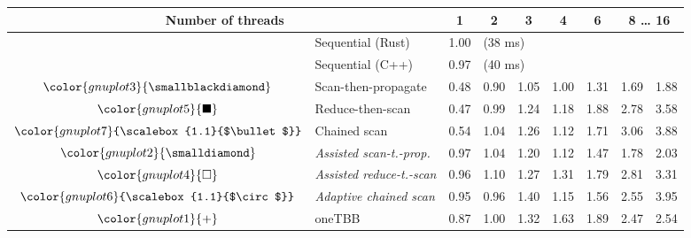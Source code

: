 \begin{tabular}{clrrrrrrr}
\toprule
\multicolumn{2}{c}{\textbf{Number of threads}} & \multicolumn{1}{c}{\textbf{ 1 }} & \multicolumn{1}{c}{\textbf{ 2 }} & \multicolumn{1}{c}{\textbf{ 3 }} & \multicolumn{1}{c}{\textbf{ 4 }} & \multicolumn{1}{c}{\textbf{ 6 }} & \multicolumn{2}{c}{\textbf{ 8 } \dots \textbf{ 16 }} \\
\midrule
& Sequential (Rust) & \multicolumn{1}{r}{ 1.00 } & \multicolumn{ 6 }{l}{(38 ms)} \\
& Sequential (C++) & \multicolumn{1}{r}{ 0.97 } & \multicolumn{ 6 }{l}{(40 ms)} \\
\rowcolor{gnuplot3!10}$\color{gnuplot3}{\smallblackdiamond}$ & Scan-then-propagate & \cellcolor{gnuplot3!10} 0.48 & \cellcolor{gnuplot3!10} 0.90 & \cellcolor{gnuplot3!10} 1.05 & \cellcolor{gnuplot3!10} 1.00 & \cellcolor{gnuplot3!10} 1.31 & \cellcolor{gnuplot3!10} 1.69 & \cellcolor{gnuplot3!10} 1.88 \\
\rowcolor{gnuplot5!10}$\color{gnuplot5}{\blacksquare}$ & Reduce-then-scan & \cellcolor{gnuplot5!10} 0.47 & \cellcolor{gnuplot5!10} 0.99 & \cellcolor{gnuplot5!10} 1.24 & \cellcolor{gnuplot5!10} 1.18 & \cellcolor{gnuplot5!10} 1.88 & \cellcolor{gnuplot5!10} 2.78 & \cellcolor{gnuplot5!10} 3.58 \\
\rowcolor{gnuplot7!10}$\color{gnuplot7}{\scalebox{1.1}{$\bullet$}}$ & Chained scan & \cellcolor{gnuplot7!10} 0.54 & \cellcolor{gnuplot7!10} 1.04 & \cellcolor{gnuplot7!10} 1.26 & \cellcolor{gnuplot7!10} 1.12 & \cellcolor{gnuplot7!10} 1.71 & \cellcolor{gnuplot7!10} 3.06 & \cellcolor{gnuplot7!10} 3.88 \\
\rowcolor{gnuplot2!30}$\color{gnuplot2}{\smalldiamond}$ & \textit{Assisted scan-t.-prop.} & \cellcolor{gnuplot2!30} 0.97 & \cellcolor{gnuplot2!30} 1.04 & \cellcolor{gnuplot2!30} 1.20 & \cellcolor{gnuplot2!30} 1.12 & \cellcolor{gnuplot2!30} 1.47 & \cellcolor{gnuplot2!30} 1.78 & \cellcolor{gnuplot2!30} 2.03 \\
\rowcolor{gnuplot4!30}$\color{gnuplot4}{\square}$ & \textit{Assisted reduce-t.-scan} & \cellcolor{gnuplot4!30} 0.96 & \cellcolor{gnuplot4!30} 1.10 & \cellcolor{gnuplot4!30} 1.27 & \cellcolor{gnuplot4!30} 1.31 & \cellcolor{gnuplot4!30} 1.79 & \cellcolor{gnuplot4!30} 2.81 & \cellcolor{gnuplot4!30} 3.31 \\
\rowcolor{gnuplot6!30}$\color{gnuplot6}{\scalebox{1.1}{$\circ$}}$ & \textit{Adaptive chained scan} & \cellcolor{gnuplot6!30} 0.95 & \cellcolor{gnuplot6!30} 0.96 & \cellcolor{gnuplot6!30} 1.40 & \cellcolor{gnuplot6!30} 1.15 & \cellcolor{gnuplot6!30} 1.56 & \cellcolor{gnuplot6!30} 2.55 & \cellcolor{gnuplot6!30} 3.95 \\
\rowcolor{gnuplot1!10}$\color{gnuplot1}{+}$ & oneTBB & \cellcolor{gnuplot1!10} 0.87 & \cellcolor{gnuplot1!10} 1.00 & \cellcolor{gnuplot1!10} 1.32 & \cellcolor{gnuplot1!10} 1.63 & \cellcolor{gnuplot1!10} 1.89 & \cellcolor{gnuplot1!10} 2.47 & \cellcolor{gnuplot1!10} 2.54 \\
\bottomrule
\end{tabular}
